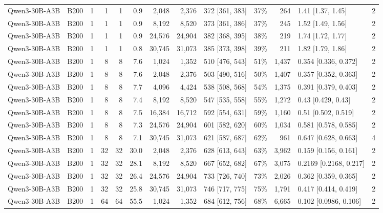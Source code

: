 \begin{landscape}
\begin{longtable}{llrrrrrrlrrlr}
Qwen3-30B-A3B & B200 & 1 & 1 & 1 & 0.9 & 2,048 & 2,376 & 372 {[}361, 383{]} & 37\% & 264 & 1.41 {[}1.37, 1.45{]} & 2 \\
Qwen3-30B-A3B & B200 & 1 & 1 & 1 & 0.9 & 8,192 & 8,520 & 373 {[}361, 386{]} & 37\% & 245 & 1.52 {[}1.49, 1.56{]} & 2 \\
Qwen3-30B-A3B & B200 & 1 & 1 & 1 & 0.9 & 24,576 & 24,904 & 382 {[}368, 395{]} & 38\% & 219 & 1.74 {[}1.72, 1.77{]} & 2 \\
Qwen3-30B-A3B & B200 & 1 & 1 & 1 & 0.8 & 30,745 & 31,073 & 385 {[}373, 398{]} & 39\% & 211 & 1.82 {[}1.79, 1.86{]} & 2 \\
Qwen3-30B-A3B & B200 & 1 & 8 & 8 & 7.6 & 1,024 & 1,352 & 510 {[}476, 543{]} & 51\% & 1,437 & 0.354 {[}0.336, 0.372{]} & 2 \\
Qwen3-30B-A3B & B200 & 1 & 8 & 8 & 7.6 & 2,048 & 2,376 & 503 {[}490, 516{]} & 50\% & 1,407 & 0.357 {[}0.352, 0.363{]} & 2 \\
Qwen3-30B-A3B & B200 & 1 & 8 & 8 & 7.7 & 4,096 & 4,424 & 538 {[}508, 568{]} & 54\% & 1,375 & 0.391 {[}0.379, 0.403{]} & 2 \\
Qwen3-30B-A3B & B200 & 1 & 8 & 8 & 7.4 & 8,192 & 8,520 & 547 {[}535, 558{]} & 55\% & 1,272 & 0.43 {[}0.429, 0.43{]} & 2 \\
Qwen3-30B-A3B & B200 & 1 & 8 & 8 & 7.5 & 16,384 & 16,712 & 592 {[}554, 631{]} & 59\% & 1,160 & 0.51 {[}0.502, 0.519{]} & 2 \\
Qwen3-30B-A3B & B200 & 1 & 8 & 8 & 7.3 & 24,576 & 24,904 & 601 {[}582, 620{]} & 60\% & 1,034 & 0.581 {[}0.578, 0.585{]} & 2 \\
Qwen3-30B-A3B & B200 & 1 & 8 & 8 & 7.1 & 30,745 & 31,073 & 621 {[}587, 687{]} & 62\% & 961 & 0.647 {[}0.628, 0.663{]} & 4 \\
Qwen3-30B-A3B & B200 & 1 & 32 & 32 & 30.0 & 2,048 & 2,376 & 628 {[}613, 643{]} & 63\% & 3,962 & 0.159 {[}0.156, 0.161{]} & 2 \\
Qwen3-30B-A3B & B200 & 1 & 32 & 32 & 28.1 & 8,192 & 8,520 & 667 {[}652, 682{]} & 67\% & 3,075 & 0.2169 {[}0.2168, 0.217{]} & 2 \\
Qwen3-30B-A3B & B200 & 1 & 32 & 32 & 26.4 & 24,576 & 24,904 & 733 {[}726, 740{]} & 73\% & 2,026 & 0.362 {[}0.359, 0.365{]} & 2 \\
Qwen3-30B-A3B & B200 & 1 & 32 & 32 & 25.8 & 30,745 & 31,073 & 746 {[}717, 775{]} & 75\% & 1,791 & 0.417 {[}0.414, 0.419{]} & 2 \\
Qwen3-30B-A3B & B200 & 1 & 64 & 64 & 55.5 & 1,024 & 1,352 & 684 {[}612, 756{]} & 68\% & 6,665 & 0.102 {[}0.0986, 0.106{]} & 2 \\

\end{longtable}
\end{landscape}
